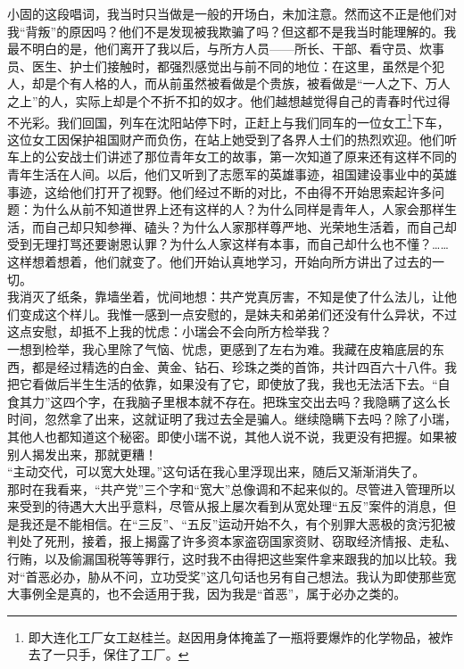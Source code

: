 小固的这段唱词，我当时只当做是一般的开场白，未加注意。然而这不正是他们对我“背叛”的原因吗？他们不是发现被我欺骗了吗？但这都不是我当时能理解的。我最不明白的是，他们离开了我以后，与所方人员——所长、干部、看守员、炊事员、医生、护士们接触时，都强烈感觉出与前不同的地位：在这里，虽然是个犯人，却是个有人格的人，而从前虽然被看做是个贵族，被看做是“一人之下、万人之上”的人，实际上却是个不折不扣的奴才。他们越想越觉得自己的青春时代过得不光彩。我们回国，列车在沈阳站停下时，正赶上与我们同车的一位女工\footnote{即大连化工厂女工赵桂兰。赵因用身体掩盖了一瓶将要爆炸的化学物品，被炸去了一只手，保住了工厂。}下车，这位女工因保护祖国财产而负伤，在站上她受到了各界人士们的热烈欢迎。他们听车上的公安战士们讲述了那位青年女工的故事，第一次知道了原来还有这样不同的青年生活在人间。以后，他们又听到了志愿军的英雄事迹，祖国建设事业中的英雄事迹，这给他们打开了视野。他们经过不断的对比，不由得不开始思索起许多问题：为什么从前不知道世界上还有这样的人？为什么同样是青年人，人家会那样生活，而自己却只知参禅、磕头？为什么人家那样尊严地、光荣地生活着，而自己却受到无理打骂还要谢恩认罪？为什么人家这样有本事，而自己却什么也不懂？……\\

这样想着想着，他们就变了。他们开始认真地学习，开始向所方讲出了过去的一切。\\

我消灭了纸条，靠墙坐着，忧间地想：共产党真厉害，不知是使了什么法儿，让他们变成这个样儿。我惟一感到一点安慰的，是妹夫和弟弟们还没有什么异状，不过这点安慰，却抵不上我的忧虑：小瑞会不会向所方检举我？\\

一想到检举，我心里除了气恼、忧虑，更感到了左右为难。我藏在皮箱底层的东西，都是经过精选的白金、黄金、钻石、珍珠之类的首饰，共计四百六十八件。我把它看做后半生生活的依靠，如果没有了它，即使放了我，我也无法活下去。“自食其力”这四个字，在我脑子里根本就不存在。把珠宝交出去吗？我隐瞒了这么长时间，忽然拿了出来，这就证明了我过去全是骗人。继续隐瞒下去吗？除了小瑞，其他人也都知道这个秘密。即使小瑞不说，其他人说不说，我更没有把握。如果被别人揭发出来，那就更糟！\\

“主动交代，可以宽大处理。”这句话在我心里浮现出来，随后又渐渐消失了。\\

那时在我看来，“共产党”三个字和“宽大”总像调和不起来似的。尽管进入管理所以来受到的待遇大大出乎意料，尽管从报上屡次看到从宽处理“五反”案件的消息，但是我还是不能相信。在“三反”、“五反”运动开始不久，有个别罪大恶极的贪污犯被判处了死刑，接着，报上揭露了许多资本家盗窃国家资财、窃取经济情报、走私、行贿，以及偷漏国税等等罪行，这时我不由得把这些案件拿来跟我的加以比较。我对“首恶必办，胁从不问，立功受奖”这几句话也另有自己想法。我认为即使那些宽大事例全是真的，也不会适用于我，因为我是“首恶”，属于必办之类的。\\

